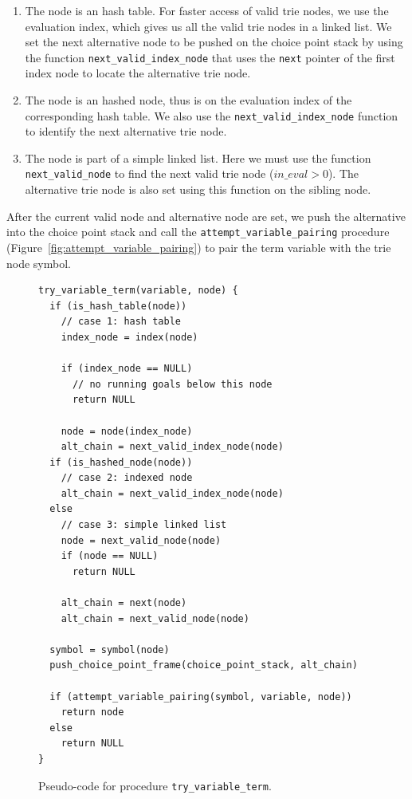 \begin{enumerate}
   \item The node is an hash table. For faster access of valid trie nodes, we use the
   evaluation index, which gives us all the valid trie nodes in a linked list. We set
   the next alternative node to be pushed on the choice point stack by using the function
   \texttt{next\_valid\_index\_node} that uses the \texttt{next} pointer of the first
   index node to locate the alternative trie node.
   \item The node is an hashed node, thus is on the evaluation index of the corresponding
   hash table. We also use the \texttt{next\_valid\_index\_node} function to identify
   the next alternative trie node.
   \item The node is part of a simple linked list. Here we must use the function
   \texttt{next\_valid\_node} to find the next valid trie node ($in\_eval > 0$).
   The alternative trie node is also set using this function on the sibling node.
\end{enumerate}

After the current valid node and alternative node are set, we push the alternative into
the choice point stack and call the \texttt{attempt\_variable\_pairing} procedure
(Figure~\ref{fig:attempt_variable_pairing})
to pair the term variable with the trie node symbol.

\begin{figure}[ht]
\begin{Verbatim}
try_variable_term(variable, node) {
  if (is_hash_table(node))
    // case 1: hash table
    index_node = index(node)
    
    if (index_node == NULL)
      // no running goals below this node
      return NULL
    
    node = node(index_node)
    alt_chain = next_valid_index_node(node)
  if (is_hashed_node(node))
    // case 2: indexed node
    alt_chain = next_valid_index_node(node)
  else
    // case 3: simple linked list
    node = next_valid_node(node)
    if (node == NULL)
      return NULL
    
    alt_chain = next(node)
    alt_chain = next_valid_node(node)
  
  symbol = symbol(node)
  push_choice_point_frame(choice_point_stack, alt_chain)
  
  if (attempt_variable_pairing(symbol, variable, node))
    return node
  else
    return NULL
}
\end{Verbatim}
\caption{Pseudo-code for procedure \texttt{try\_variable\_term}.}
\label{fig:try_variable_term}
\end{figure}

